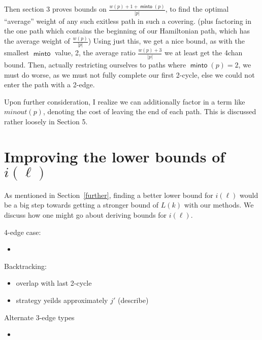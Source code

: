 \documentclass{article}
\DeclareMathOperator{\minto}{\bm{\mathsf{minto}}}
\begin{document}
{Then section 3 proves bounds on $\frac{w(p) + 1+ \minto(p)}{|p|}$, to find the optimal ``average'' weight of any such exitless path in such a covering. (plus factoring in the one path which contains the beginning of our Hamiltonian path, which has the average weight of $\frac{w(p)}{|p|}$) Using just this, we get a nice bound, as with the smallest $\minto$ value, 2, the average ratio $\frac{w(p)+3}{|p|}$ we at least get the 4chan bound. Then, actually restricting ourselves to paths where $\minto(p)=2$, we must do worse, as we must not fully complete our first 2-cycle, else we could not enter the path with a 2-edge.

Upon further consideration, I realize we can additionally factor in a term like $minout(p)$, denoting the cost of leaving the end of each path. This is discussed rather loosely in Section 5.

\section{Improving the lower bounds of \texorpdfstring{$i(\ell)$}{i(l)}}

As mentioned in Section~\ref{further}, finding a better lower bound for $i(\ell)$ would be a big step towards getting a stronger bound of $L(k)$ with our methods. We discuss how one might go about deriving bounds for $i(\ell)$.

4-edge case:
\begin{itemize}
    \item 
\end{itemize}

Backtracking: 
\begin{itemize}
    \item overlap with last 2-cycle
    \item strategy yeilds approximately $j'$ (describe)
\end{itemize}

Alternate 3-edge types
\begin{itemize}
    \item 
\end{itemize}}
\end{document}
